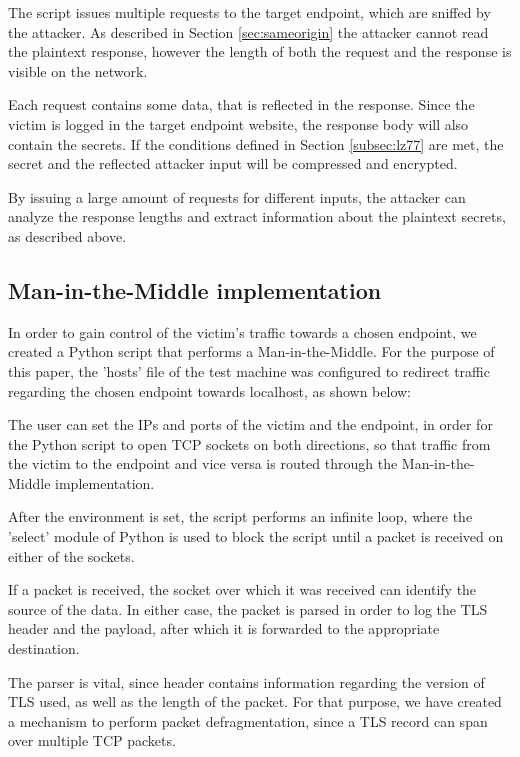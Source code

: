 The script issues multiple requests to the target endpoint, which are sniffed by
the attacker. As described in Section \ref{sec:sameorigin} the attacker cannot
read the plaintext response, however the length of both the request and the
response is visible on the network.

Each request contains some data, that is reflected in the response. Since the
victim is logged in the target endpoint website, the response body will also
contain the secrets. If the conditions defined in Section \ref{subsec:lz77} are
met, the secret and the reflected attacker input will be compressed and
encrypted.

By issuing a large amount of requests for different inputs, the attacker can
analyze the response lengths and extract information about the plaintext
secrets, as described above.

\subsection{Man-in-the-Middle implementation}

In order to gain control of the victim's traffic towards a chosen endpoint, we
created a Python script that performs a Man-in-the-Middle. For the purpose of
this paper, the 'hosts' file of the test machine was configured to redirect
traffic regarding the chosen endpoint towards localhost, as shown below:


The user can set the IPs and ports of the victim and the endpoint, in order for
the Python script to open TCP sockets on both directions, so that traffic from
the victim to the endpoint and vice versa is routed through the
Man-in-the-Middle implementation.

After the environment is set, the script performs an infinite loop, where the
'select' module of Python is used to block the script until a packet is received
on either of the sockets.

If a packet is received, the socket over which it was received can identify the
source of the data. In either case, the packet is parsed in order to log the TLS
header and the payload, after which it is forwarded to the appropriate
destination.

The parser is vital, since header contains information regarding the version of
TLS used, as well as the length of the packet. For that purpose, we have created
a mechanism to perform packet defragmentation, since a TLS record can span over
multiple TCP packets.

